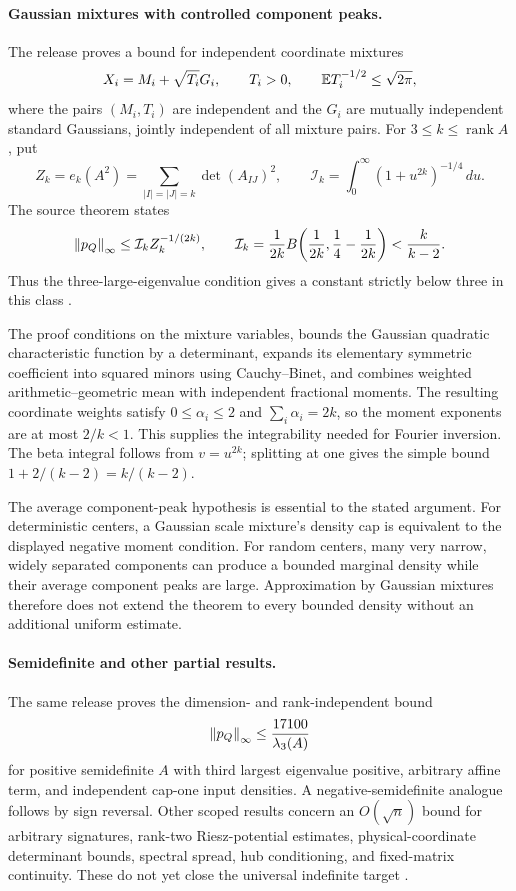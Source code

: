 \paragraph{Gaussian mixtures with controlled component peaks.}
The release proves a bound for independent coordinate mixtures
\[
X_i=M_i+\sqrt{T_i}G_i,\qquad T_i>0,\qquad
\mathbb{E} T_i^{-1/2}\leq\sqrt{2\pi},
\]
where the pairs $(M_i,T_i)$ are independent and the $G_i$ are mutually independent standard Gaussians, jointly independent of all mixture pairs. For $3\leq k\leq\operatorname{rank}A$, put
\[
Z_k=e_k(A^2)=\sum_{|I|=|J|=k}\det(A_{IJ})^2,
\qquad
\mathcal I_k=\int_0^\infty(1+u^{2k})^{-1/4}\,du.
\]
The source theorem states
\begin{equation}
\left\lVert p_Q\right\rVert_\infty\leq\mathcal I_k Z_k^{-1/(2k)},\qquad
\mathcal I_k=\frac1{2k}B\!\left(\frac1{2k},\frac14-\frac1{2k}\right)
<\frac{k}{k-2}.
\label{eq:qformmixture}
\end{equation}
Thus the three-large-eigenvalue condition gives a constant strictly below three in this class \citep{CaseQFORMGaussian2026}.

The proof conditions on the mixture variables, bounds the Gaussian quadratic characteristic function by a determinant, expands its elementary symmetric coefficient into squared minors using Cauchy--Binet, and combines weighted arithmetic--geometric mean with independent fractional moments. The resulting coordinate weights satisfy $0\leq\alpha_i\leq2$ and $\sum_i\alpha_i=2k$, so the moment exponents are at most $2/k<1$. This supplies the integrability needed for Fourier inversion. The beta integral follows from $v=u^{2k}$; splitting at one gives the simple bound $1+2/(k-2)=k/(k-2)$.

The average component-peak hypothesis is essential to the stated argument. For deterministic centers, a Gaussian scale mixture's density cap is equivalent to the displayed negative moment condition. For random centers, many very narrow, widely separated components can produce a bounded marginal density while their average component peaks are large. Approximation by Gaussian mixtures therefore does not extend the theorem to every bounded density without an additional uniform estimate.

\paragraph{Semidefinite and other partial results.}
The same release proves the dimension- and rank-independent bound
\[
\left\lVert p_Q\right\rVert_\infty\leq \frac{17100}{\lambda_3(A)}
\]
for positive semidefinite $A$ with third largest eigenvalue positive, arbitrary affine term, and independent cap-one input densities. A negative-semidefinite analogue follows by sign reversal. Other scoped results concern an $O(\sqrt n)$ bound for arbitrary signatures, rank-two Riesz-potential estimates, physical-coordinate determinant bounds, spectral spread, hub conditioning, and fixed-matrix continuity. These do not yet close the universal indefinite target \citep{CaseQFORMSemidefinite2026,CaseQFORMRelease2026}.

